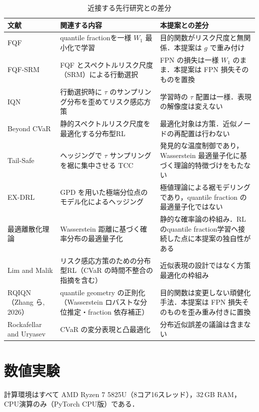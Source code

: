 \documentclass[a4paper,10pt]{jsarticle}
\theoremstyle{definition}
\newcommand{\Wone}{W_1}
\begin{document}
\begin{table}[htbp]
\centering
\caption{近接する先行研究との差分}
\label{tab:novelty}
\small
\setlength{\tabcolsep}{3pt}
\begin{tabular}{p{3.8cm}p{5.0cm}p{5.6cm}}
\toprule
文献 & 関連する内容 & 本提案との差分\\
\midrule
FQF \cite{yang2019fqf} & quantile fractionを一様 $\Wone$ 最小化で学習 & 目的関数がリスク尺度と無関係．本提案は $g$ で重み付け\\
FQF-SRM \cite{gan2026energy} & FQF とスペクトルリスク尺度（SRM）による行動選択 & FPN の損失は一様 $W_1$ のまま．本提案は FPN 損失そのものを置換\\
IQN \cite{dabney2018iqn} & 行動選択時に $\tau$ のサンプリング分布を歪めてリスク感応方策 & 学習時の $\tau$ 配置は一様．表現の解像度は変えない\\
Beyond CVaR \cite{moghimi2025beyond} & 静的スペクトルリスク尺度を最適化する分布型RL & 最適化対象は方策．近似ノードの再配置は行わない\\
Tail-Safe \cite{zhang2025tailsafe} & ヘッジングで $\tau$ サンプリングを裾に集中させる TCC & 発見的な温度制御であり，Wasserstein 最適量子化に基づく理論的特徴づけをもたない\\
EX-DRL \cite{malekzadeh2024exdrl} & GPD を用いた極端分位点のモデル化によるヘッジング & 極値理論による裾モデリングであり，quantile fraction の最適量子化ではない\\
最適離散化理論 \cite{graf2000quantization,pflug2014multistage} & Wasserstein 距離に基づく確率分布の最適量子化 & 静的な確率論の枠組み．RL のquantile fraction学習へ接続した点に本提案の独自性がある\\
Lim and Malik \cite{lim2022distributional} & リスク感応方策のための分布型RL（CVaR の時間不整合の指摘を含む） & 近似表現の設計ではなく方策最適化の枠組み\\
RQIQN（Zhang ら, 2026）\cite{zhang2026rqiqn} & quantile geometry の正則化（Wasserstein ロバストな分位推定・fraction 依存補正） & 目的関数は変更しない頑健化手法．本提案は FPN 損失そのものを歪み重み付きに置換\\
Rockafellar and Uryasev \cite{rockafellar2000cvar} & CVaR の変分表現と凸最適化 & 分布近似誤差の議論は含まない\\
\bottomrule
\end{tabular}
\end{table}
\section{数値実験}
\label{sec:exp}
計算環境はすべて AMD Ryzen 7 5825U（8コア16スレッド），32\,GB RAM，CPU演算のみ（PyTorch CPU版）である．
\end{document}
